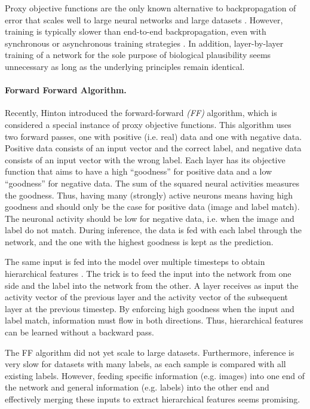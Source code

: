 Proxy objective functions are the only known alternative to backpropagation of error that scales well to large neural networks and large datasets \cite{bartunov_assessing_2018, duan_modularizing_2022}.
However, training is typically slower than end-to-end backpropagation, even with synchronous or asynchronous training strategies  \cite{belilovsky_decoupled_2020}.
In addition, layer-by-layer training of a network for the sole purpose of biological plausibility seems unnecessary as long as the underlying principles remain identical.

\paragraph{Forward Forward Algorithm.}
Recently, Hinton \cite{hinton_forward-forward_2022} introduced the forward-forward \emph{(FF)} algorithm, which is considered a special instance of proxy objective functions.
This algorithm uses two forward passes, one with positive (i.e. real) data and one with negative data.
Positive data consists of an input vector and the correct label, and negative data consists of an input vector with the wrong label.
Each layer has its objective function that aims to have a high ``goodness'' for positive data and a low ``goodness'' for negative data. 
The sum of the squared neural activities measures the goodness. Thus, having many (strongly) active neurons means having high goodness and should only be the case for positive data (image and label match). The neuronal activity should be low for negative data, i.e. when the image and label do not match.
During inference, the data is fed with each label through the network, and the one with the highest goodness is kept as the prediction.

The same input is fed into the model over multiple timesteps to obtain hierarchical features .
The trick is to feed the input into the network from one side and the label into the network from the other. A layer receives as input the activity vector of the previous layer and the activity vector of the subsequent layer at the previous timestep. By enforcing high goodness when the input and label match, information must flow in both directions. Thus, hierarchical features can be learned without a backward pass.

The FF algorithm did not yet scale to large datasets. Furthermore, inference is very slow for datasets with many labels, as each sample is compared with all existing labels. However, feeding specific information (e.g. images) into one end of the network and general information (e.g. labels) into the other end and effectively merging these inputs to extract hierarchical features seems promising.

